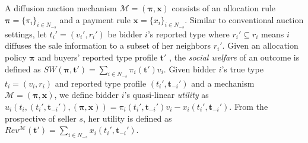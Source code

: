\documentclass{article}
\begin{document}
A diffusion auction mechanism $\mathcal{M}=(\boldsymbol{\pi},\mathbf{x})$ consists of an allocation rule $\boldsymbol{\pi}=\{\pi_i\}_{i\in N_{-s}}$ and a payment rule $\mathbf{x}=\{x_i\}_{i\in N_{-s}}$. Similar to conventional auction settings, let $t_i'=(v_i',r_i')$ be bidder $i$'s reported type where $r_i'\subseteq r_i$ means $i$ diffuses the sale information to a subset of her neighbors $r_i'$. Given an allocation policy $\boldsymbol{\pi}$ and buyers' reported type profile $\mathbf{t}'$ , the \emph{social welfare} of an outcome is defined as $SW(\boldsymbol{\pi},\mathbf{t}')=\sum_{i\in N_{-s}}\pi_i(\mathbf{t}') v_i$. Given bidder $i$'s true type $t_i=(v_i,r_i)$ and reported type profile $(t_i',\mathbf{t}_{-i}')$ and a mechanism $\mathcal{M}=(\boldsymbol{\pi},\mathbf{x})$, we define bidder $i$'s quasi-linear \emph{utility} as $u_i(t_i,(t_i',\mathbf{t}_{-i}'),(\boldsymbol{\pi},\mathbf{x}))=\pi_i(t_i',\mathbf{t}_{-i}')v_i - x_i(t_i',\mathbf{t}_{-i}')$. From the prospective of seller $s$, her utility is defined as $Rev^{\mathcal{M}}(\mathbf{t}')=\sum_{i\in N_{-s}}x_i(t_i',\mathbf{t}_{-i}')$.
\end{document}
